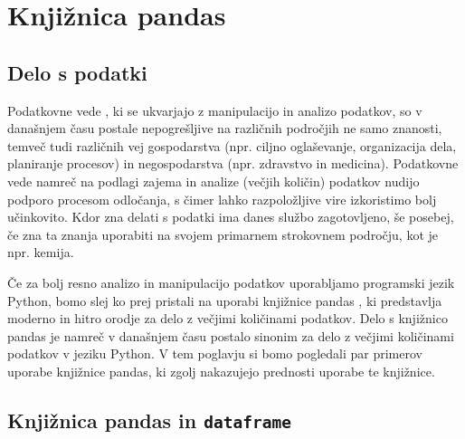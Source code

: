 \chapter{Knjižnica pandas}

\section{Delo s podatki}

Podatkovne vede , ki se ukvarjajo z manipulacijo in analizo podatkov, so v današnjem času postale nepogrešljive na različnih področjih ne samo znanosti, temveč tudi različnih vej gospodarstva (npr. ciljno oglaševanje, organizacija dela, planiranje procesov) in negospodarstva (npr. zdravstvo in medicina). Podatkovne vede namreč na podlagi zajema in analize (večjih količin) podatkov nudijo podporo procesom odločanja, s čimer lahko razpoložljive vire izkoristimo bolj učinkovito. Kdor zna delati s podatki ima danes službo zagotovljeno, še posebej, če zna ta znanja uporabiti na svojem primarnem strokovnem področju, kot je npr. kemija. 

Če za bolj resno analizo in manipulacijo podatkov uporabljamo programski jezik Python, bomo slej ko prej pristali na uporabi knjižnice pandas , ki predstavlja moderno in hitro orodje za delo z večjimi količinami podatkov. Delo s knjižnico pandas je namreč v današnjem času postalo sinonim za delo z večjimi količinami podatkov v jeziku Python. V tem poglavju si bomo pogledali par primerov uporabe knjižnice pandas, ki zgolj nakazujejo prednosti uporabe te knjižnice. 

\section{Knjižnica pandas in \texttt{dataframe}}

